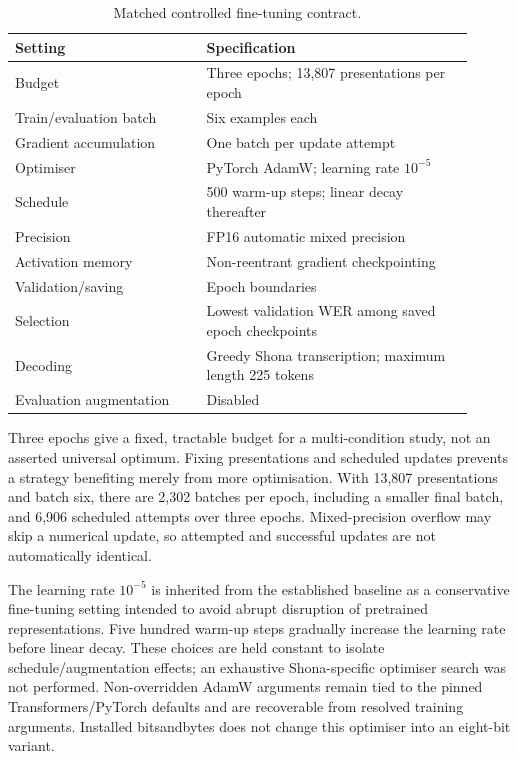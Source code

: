 \documentclass[12pt,a4paper]{report}
\begin{document}
\begin{table}[htbp]\centering
\caption{Matched controlled fine-tuning contract.}\label{tab:training}
\begin{tabular}{p{0.38\linewidth}p{0.53\linewidth}}\toprule Setting & Specification\\\midrule
Budget & Three epochs; 13,807 presentations per epoch\\
Train/evaluation batch & Six examples each\\
Gradient accumulation & One batch per update attempt\\
Optimiser & PyTorch AdamW; learning rate $10^{-5}$\\
Schedule & 500 warm-up steps; linear decay thereafter\\
Precision & FP16 automatic mixed precision\\
Activation memory & Non-reentrant gradient checkpointing\\
Validation/saving & Epoch boundaries\\
Selection & Lowest validation WER among saved epoch checkpoints\\
Decoding & Greedy Shona transcription; maximum length 225 tokens\\
Evaluation augmentation & Disabled\\\bottomrule
\end{tabular}\end{table}

Three epochs give a fixed, tractable budget for a multi-condition study, not an asserted universal optimum. Fixing presentations and scheduled updates prevents a strategy benefiting merely from more optimisation. With 13,807 presentations and batch six, there are 2,302 batches per epoch, including a smaller final batch, and 6,906 scheduled attempts over three epochs. Mixed-precision overflow may skip a numerical update, so attempted and successful updates are not automatically identical.

The learning rate $10^{-5}$ is inherited from the established baseline as a conservative fine-tuning setting intended to avoid abrupt disruption of pretrained representations. Five hundred warm-up steps gradually increase the learning rate before linear decay. These choices are held constant to isolate schedule/augmentation effects; an exhaustive Shona-specific optimiser search was not performed. Non-overridden AdamW arguments remain tied to the pinned Transformers/PyTorch defaults and are recoverable from resolved training arguments. Installed bitsandbytes does not change this optimiser into an eight-bit variant.
\end{document}
